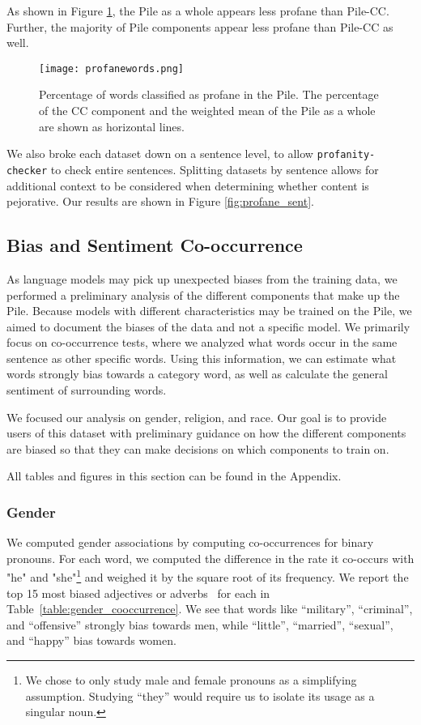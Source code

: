 \documentclass[11pt,a4paper]{article}
\begin{document}
As shown in Figure \ref{fig:profane_words}, the Pile as a whole appears less profane than Pile-CC. Further, the majority of Pile components appear less profane than Pile-CC as well.

\begin{figure}[ht]
  \texttt{[image: profanewords.png]}
  \caption{Percentage of words classified as profane in the Pile. The percentage of the CC component and the weighted mean of the Pile as a whole are shown as horizontal lines.}
  \label{fig:profane_words}
\end{figure}

We also broke each dataset down on a sentence level, to allow \texttt{profanity-checker} to check entire sentences. Splitting datasets by sentence allows for additional context to be considered when determining whether content is pejorative. Our results are shown in Figure  \ref{fig:profane_sent}.

\subsection{Bias and Sentiment Co-occurrence}
As language models may pick up unexpected biases from the training data, we performed a preliminary analysis of the different components that make up the Pile. Because models with different characteristics may be trained on the Pile, we aimed to document the biases of the data and not a specific model. We primarily focus on co-occurrence tests, where we analyzed what words occur in the same sentence as other specific words. Using this information, we can estimate what words strongly bias towards a category word, as well as calculate the general sentiment of surrounding words.

We focused our analysis on gender, religion, and race. Our goal is to provide users of this dataset with preliminary guidance on how the different components are biased so that they can make decisions on which components to train on. 

All tables and figures in this section can be found in the Appendix.

\subsubsection{Gender}
We computed gender associations by computing co-occurrences for binary pronouns. For each word, we computed the difference in the rate it co-occurs with "he" and "she"\footnote{We chose to only study male and female pronouns as a simplifying assumption. Studying ``they'' would require us to isolate its usage as a singular noun. } and weighed it by the square root of its frequency. We report the top 15 most biased adjectives or adverbs~\citep{nltk} for each in Table~\ref{table:gender_cooccurrence}. We see that words like ``military'', ``criminal'', and ``offensive'' strongly bias towards men, while ``little'', ``married'', ``sexual'', and ``happy'' bias towards women.
\end{document}
